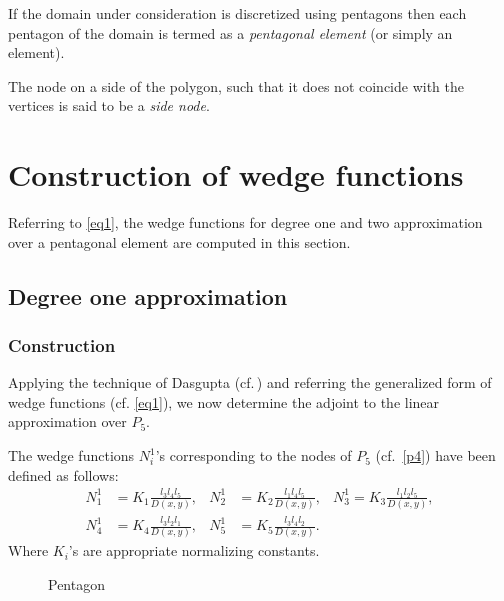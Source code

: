 \documentclass[automatic-bibliography, defaultmaths=false]{univsci}
\begin{document}
\begin{definition}
  If the domain under consideration is discretized using pentagons then each
  pentagon of the domain is termed as a \emph{pentagonal element} (or simply an
  element).
\end{definition}

\begin{definition}
  The node on a side of the polygon, such that it does not coincide with
  the vertices is said to be a \emph{side node}.
\end{definition}

\section{Construction of wedge functions}\label{sec3}
Referring to \autoref{eq1}, the wedge functions for degree one and two
approximation over a pentagonal element are  computed in this section.

\subsection{Degree one approximation}

\subsubsection{Construction}

Applying the technique of Dasgupta (cf.\,\cite{das}) and referring the
generalized form of wedge functions (cf. \autoref{eq1}), we now determine the
adjoint to the linear approximation over $P_5$.

The wedge functions $N_i^1$\rq{}s corresponding to the nodes of $P_5$
(cf.~\autoref{p4}) have been defined as follows:
\begin{equation}
  \begin{aligned}\label{d2}
    N_1^1&=K_1\frac{l_{3}l_{4}l_{5}}{D(x,y)},
    &N_2^1&=K_2\frac{l_{1}l_{4}l_{5}}{D(x,y)},
    &N_3^1=K_3\frac{l_{1}l_{2}l_{5}}{D(x,y)},\\
    N_4^1&=K_4\frac{l_{3}l_{2}l_{1}}{D(x,y)},
    &N_5^1&=K_5\frac{l_{3}l_{4}l_{2}}{D(x,y)}.
  \end{aligned}
\end{equation}
Where $K_i$'s are appropriate normalizing constants.
\begin{figure}[t!]
  \centering
  \caption{Pentagon}\label{p4}
\end{figure}
\end{document}
